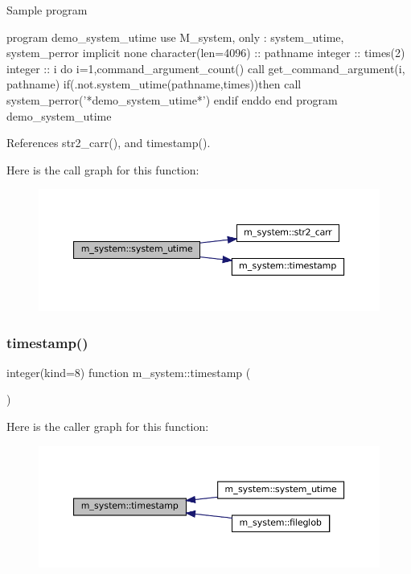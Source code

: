 \begin{DoxyVerb}  Sample program

   program demo_system_utime
   use M_system, only : system_utime, system_perror
   implicit none
   character(len=4096) :: pathname
   integer             :: times(2)
   integer             :: i
      do i=1,command_argument_count()
         call get_command_argument(i, pathname)
         if(.not.system_utime(pathname,times))then
            call system_perror('*demo_system_utime*')
         endif
      enddo
   end program demo_system_utime \end{DoxyVerb}
 

References str2\+\_\+carr(), and timestamp().

Here is the call graph for this function\+:\nopagebreak
\begin{figure}[H]
\begin{center}
\leavevmode
\includegraphics[width=350pt]{namespacem__system_a83a121ba0b525210b5217565569ef350_cgraph}
\end{center}
\end{figure}
\mbox{\label{namespacem__system_a635baf5850927faa97461afaca512235}} 
\subsubsection{\texorpdfstring{timestamp()}{timestamp()}}
{\footnotesize\ttfamily integer(kind=8) function m\+\_\+system\+::timestamp (\begin{DoxyParamCaption}{ }\end{DoxyParamCaption})\hspace{0.3cm}{\ttfamily [private]}}

Here is the caller graph for this function\+:
\nopagebreak
\begin{figure}[H]
\begin{center}
\leavevmode
\includegraphics[width=350pt]{namespacem__system_a635baf5850927faa97461afaca512235_icgraph}
\end{center}
\end{figure}



